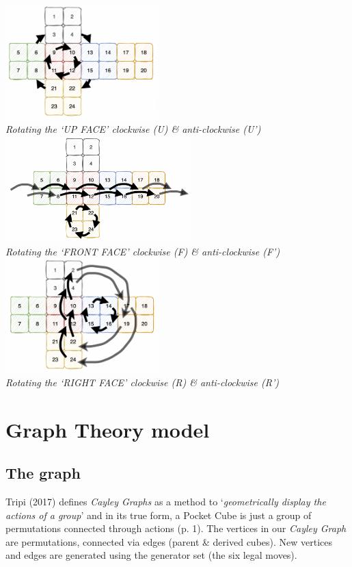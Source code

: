 \documentclass[a4paper]{article}
\begin{document}
\begin{center}
\includegraphics[width=5.9cm]{upface-clockwise.png}\\
\emph{Rotating the ‘UP FACE’ clockwise (U) \& anti-clockwise (U')}
\includegraphics[width=7.2cm]{frontface-clockwise.png}\\
\emph{Rotating the ‘FRONT FACE’ clockwise (F) \& anti-clockwise (F')}
\includegraphics[width=5.9cm]{rightface-clockwise.png}\\
\emph{Rotating the ‘RIGHT FACE’ clockwise (R) \& anti-clockwise (R')}
\end{center}

\section{Graph Theory model}
\subsection{The graph}
\label{graph}

\par Tripi (2017) defines \emph{Cayley Graphs} as a method to ‘\emph{geometrically display the actions of a group}’ and in its true form, a Pocket Cube is just a group of permutations connected through actions (p. 1). The vertices in our \emph{Cayley Graph} are permutations, connected via edges (parent \& derived cubes). New vertices and edges are generated using the generator set (the six legal moves).
\end{document}

